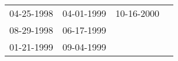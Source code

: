 \begin{supertabular}{llll}
 04-25-1998 &  04-01-1999 &  10-16-2000 \\
 08-29-1998 &  06-17-1999 &             \\
 01-21-1999 &  09-04-1999 &             \\
\end{supertabular}
